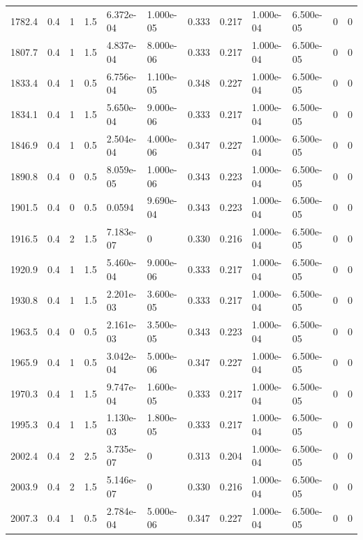 \documentclass[preview]{standalone}
\begin{document}
{{{\begin{tabular}{L{1.2cm}C{1.2cm} C{0.3cm}C{0.5cm} C{1.4cm}C{1.4cm} C{1.4cm}C{1.4cm} C{1.6cm}C{1.6cm} C{1.6cm}C{1.6cm}}
  1782.4  &   0.4  & 1     & 1.5 &  6.372e-04  & 1.000e-05  &  0.333&   0.217& 1.000e-04 & 6.500e-05   &  0 & 0  \\ 
  1807.7  &   0.4  & 1     & 1.5 &  4.837e-04  & 8.000e-06  &  0.333&   0.217& 1.000e-04 & 6.500e-05   &  0 & 0  \\ 
  1833.4  &   0.4  & 1     & 0.5 &  6.756e-04  & 1.100e-05  &  0.348&   0.227& 1.000e-04 & 6.500e-05   &  0 & 0  \\ 
  1834.1  &   0.4  & 1     & 1.5 &  5.650e-04  & 9.000e-06  &  0.333&   0.217& 1.000e-04 & 6.500e-05   &  0 & 0  \\ 
  1846.9  &   0.4  & 1     & 0.5 &  2.504e-04  & 4.000e-06  &  0.347&   0.227& 1.000e-04 & 6.500e-05   &  0 & 0  \\ 
  1890.8  &   0.4  & 0     & 0.5 &  8.059e-05  & 1.000e-06  &  0.343&   0.223& 1.000e-04 & 6.500e-05   &  0 & 0  \\ 
  1901.5  &   0.4  & 0     & 0.5 &  0.0594  & 9.690e-04  &  0.343&   0.223& 1.000e-04 & 6.500e-05   &  0 & 0  \\ 
  1916.5  &   0.4  & 2     & 1.5 &  7.183e-07  & 0  &  0.330&   0.216& 1.000e-04 & 6.500e-05   &  0 & 0  \\ 
  1920.9  &   0.4  & 1     & 1.5 &  5.460e-04  & 9.000e-06  &  0.333&   0.217& 1.000e-04 & 6.500e-05   &  0 & 0  \\ 
  1930.8  &   0.4  & 1     & 1.5 &  2.201e-03  & 3.600e-05  &  0.333&   0.217& 1.000e-04 & 6.500e-05   &  0 & 0  \\ 
  1963.5  &   0.4  & 0     & 0.5 &  2.161e-03  & 3.500e-05  &  0.343&   0.223& 1.000e-04 & 6.500e-05   &  0 & 0  \\ 
  1965.9  &   0.4  & 1     & 0.5 &  3.042e-04  & 5.000e-06  &  0.347&   0.227& 1.000e-04 & 6.500e-05   &  0 & 0  \\ 
  1970.3  &   0.4  & 1     & 1.5 &  9.747e-04  & 1.600e-05  &  0.333&   0.217& 1.000e-04 & 6.500e-05   &  0 & 0  \\ 
  1995.3  &   0.4  & 1     & 1.5 &  1.130e-03  & 1.800e-05  &  0.333&   0.217& 1.000e-04 & 6.500e-05   &  0 & 0  \\ 
  2002.4  &   0.4  & 2     & 2.5 &  3.735e-07  & 0  &  0.313&   0.204& 1.000e-04 & 6.500e-05   &  0 & 0  \\ 
  2003.9  &   0.4  & 2     & 1.5 &  5.146e-07  & 0  &  0.330&   0.216& 1.000e-04 & 6.500e-05   &  0 & 0  \\ 
  2007.3  &   0.4  & 1     & 0.5 &  2.784e-04  & 5.000e-06  &  0.347&   0.227& 1.000e-04 & 6.500e-05   &  0 & 0  \\ 

\end{tabular}}}}
\end{document}

